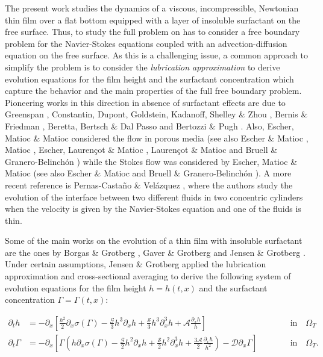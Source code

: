 \documentclass[reqno,11pt]{amsart}
\begin{document}
The present work studies the dynamics of a viscous, incompressible, Newtonian thin film over a flat bottom equipped with a layer of insoluble surfactant on the free surface. Thus, to study the full problem on has to consider a free boundary problem for the Navier-Stokes equations coupled with an advection-diffusion equation on the free surface. As this is a challenging issue, a common approach to simplify the problem is to consider the \emph{lubrication approximation} to derive evolution equations for the film height and the surfactant concentration which capture the behavior and the main properties of the full free boundary problem. Pioneering works in this direction in absence of surfactant effects are due to Greenspan \cite{greenspan1978motion}, Constantin, Dupont, Goldstein, Kadanoff, Shelley \& Zhou \cite{constantin1993droplet},  Bernis \& Friedman \cite{Bernis1990}, Beretta, Bertsch \& Dal Passo \cite{Beretta1995} and Bertozzi \& Pugh  \cite{Bertozzi1996}. Also, Escher, Matioc \& Matioc \cite{escher2012modelling} considered the flow in porous media (see also Escher \& Matioc \cite{escher2013existence}, Matioc \cite{matioc2012non}, Escher, Lauren\c{c}ot \& Matioc \cite{ELM11}, Lauren\c{c}ot \& Matioc \cite{laurenccot2013gradient,laurencot2014thin,laurenccot2017finite,laurencot2017self}
 and Bruell \& Granero-Belinch\'on \cite{BG18}) while the Stokes flow was considered by Escher, Matioc \& Matioc \cite{escher2013thin} (see also Escher \& Matioc\cite{escher2014non} and Bruell \& Granero-Belinch\'on \cite{BG18}). A more recent reference is Pernas-Casta\~no \& Vel\'azquez \cite{pernas2019analysis}, where the authors study the evolution of the interface between two different fluids in two concentric cylinders when the velocity is given by the Navier-Stokes equation and one of the fluids is thin. 

\medskip
Some of the main works on the evolution of a thin film with insoluble surfactant are the ones by Borgas \& Grotberg \cite{BG}, Gaver \& Grotberg \cite{GG} and Jensen \& Grotberg \cite{JG}. Under certain assumptions, Jensen \& Grotberg \cite{JG} applied the lubrication approximation and cross-sectional averaging to derive the following system of evolution equations for the film height $h=h(t ,x)$ and the surfactant concentration $\Gamma=\Gamma(t,x)$:

\begin{subequations}	\label{eq:system}
	\begin{alignat}{2}
		\partial_t h &=-\partial_x \left[ \frac{h^2}{2}\partial_x \sigma(\Gamma)-\frac{\mathcal{G}}{3}h^3\partial_x h + \frac{\mathcal{S}}{3}h^3\partial_x^3h+\mathcal{A}\frac{\partial_x h}{h} \right]\; && \mbox{in}\quad \Omega_T\\
		\partial_t \Gamma &=- \partial_x \left[\Gamma \left(h \partial_x \sigma(\Gamma)-\frac{\mathcal{G}}{2} h^2 \partial_x h +\frac{\mathcal{S}}{2} h^2 \partial_x^3 h + \frac{3\mathcal{A}}{2} \frac{\partial_x h }{h^{2}}\right)-\mathcal{D}\partial_x \Gamma \right]\;\qquad&&  \mbox{in}\quad \Omega_T.
	\end{alignat}
\end{subequations}
\end{document}
